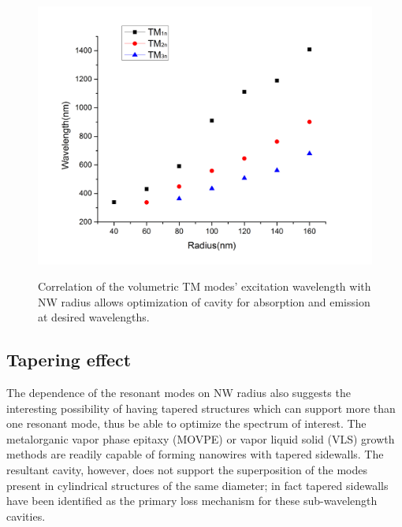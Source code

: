 \begin{figure}
  \caption{Correlation of the volumetric TM modes' excitation wavelength with NW radius allows optimization of cavity for absorption and emission at desired wavelengths.}
  \centering
  \includegraphics[width=\textwidth]{pictures/LM/TMRadiusScat}
  \label{TMRadiusScat}
\end{figure}

\subsection{Tapering effect}

The dependence of the resonant modes on NW radius also suggests the
interesting possibility of having tapered structures which can support more
than one resonant mode, thus be able to optimize the spectrum of interest. The
metalorganic vapor phase epitaxy (MOVPE) or vapor liquid solid (VLS) growth
methods are readily capable of forming nanowires with tapered sidewalls. The
resultant cavity, however, does not support the superposition of the modes
present in cylindrical structures of the same diameter; in fact tapered
sidewalls have been identified as the primary loss mechanism for these
sub-wavelength cavities.

